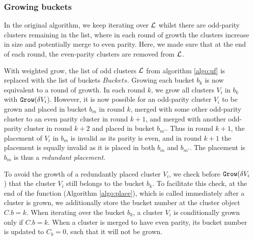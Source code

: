 

\subsubsection{Growing buckets}

In the original algorithm, we keep iterating over $\mathcal{L}$ whilst there are odd-parity clusters remaining in the list, where in each round of growth the clusters increase in size and potentially merge to even parity. Here, we made sure that at the end of each round, the even-parity clusters are removed from $\mathcal{L}$. 

With weighted grow, the list of odd clusters $\mathcal{L}$ from algorithm \ref{algo:uf} is replaced with the list of buckets $Buckets$. Growing each bucket $b_k$ is now equivalent to a round of growth. In each round $k$, we grow all clusters $V_i$ in $b_k$ with $\texttt{Grow}(\delta V_i$). However, it is now possible for an odd-parity cluster $V_i$ to be grown and placed in bucket $b_m$ in round $k$, merged with some other odd-parity cluster to an even parity cluster in round $k+1$, and merged with another odd-parity cluster in round $k+2$ and placed in bucket $b_{m'}$. Thus in round $k+1$, the placement of $V_i$ in $b_m$ is invalid as its parity is even, and in round $k+1$ the placement is equally invalid as it is placed in both $b_m$ and $b_{m'}$. The placement is $b_m$ is thus a \emph{redundant placement}. 

To avoid the growth of a redundantly placed cluster $V_i$, we check before $\texttt{Grow}(\delta V_i$) that the cluster $V_i$ still belongs to the bucket $b_k$. To facilitate this check, at the end of the function  (Algorithm \ref{algo:place}), which is called immediately after a cluster is grown, we additionally store the bucket number at the cluster object $C.b = k$. When iterating over the bucket $b_k$, a cluster $V_i$ is conditionally grown only if $C.b = k$. When a cluster is merged to have even parity, its bucket number is updated to $C_b=0$, such that it will not be grown.  

